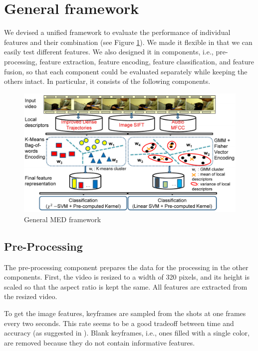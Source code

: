 \section{General framework}

We devised a unified framework to evaluate the performance of individual features and their combination (see Figure \ref{med_framework}). We made it flexible in that we can easily test different features. We also designed it in components, i.e., pre-processing, feature extraction, feature encoding, feature classification, and feature fusion, so that each component could be evaluated separately while keeping the others intact. In particular, it consists of the following components.

\begin{figure}
	\centering
	\includegraphics[width=1\textwidth]{framework.pdf}
	\caption{General MED framework}
	\label{med_framework}
\end{figure}

\subsection{Pre-Processing}

The pre-processing component prepares the data for the processing in the other components. First, the video is resized to a width of 320 pixels, and its height is scaled so that the aspect ratio is kept the same. All features are extracted from the resized video. 

To get the image features, keyframes are sampled from the shots at one frames every two seconds. This rate seems to be a good tradeoff between time and accuracy (as suggested in \cite{trecvid10:cuucf}). Blank keyframes, i.e., ones filled with a single color, are removed because they do not contain informative features.

